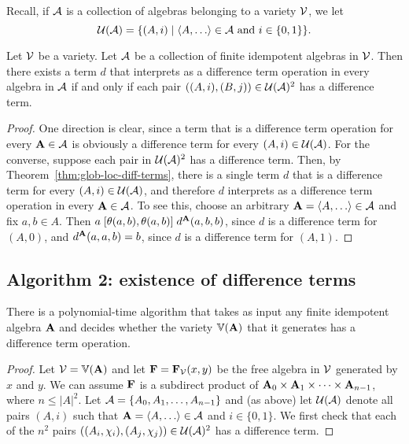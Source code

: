 Recall, if $\mathcal{A}$ is a collection of algebras belonging to a variety $\mathcal{V}$,
we let
\[
\sU(\sA) = \{(A, i) \mid \<A, \dots\> \in \sA \text{ and } i \in
\{0,1\}\}.
\]
\begin{cor}
  \label{cor:glob-loc-diff-term}
  Let $\mathcal{V}$ be a variety.  Let $\mathcal{A}$ be a collection of finite idempotent
  algebras in $\mathcal{V}$. %
  Then there exists a term $d$ that interprets as a difference term operation
  in every algebra in $\mathcal{A}$
  if and only if each pair $((A,i), (B,j)) \in \mathcal{U}(\mathcal{A})^2$ has a \glocal
  difference term.
\end{cor}
\begin{proof}
  One direction is clear, since a term that is a difference term operation for
  every $\mathbf{A} \in \mathcal{A}$ is obviously a \glocal difference term for
  every $(A, i) \in \mathcal{U}(\mathcal{A})$.
  For the converse, suppose
  each pair in $\mathcal{U}(\mathcal{A})^2$ has a \glocal
  difference term. Then, by Theorem~\ref{thm:glob-loc-diff-terms},
  there is a single term $d$ that is a \glocal difference term for every 
  $(A, i) \in \mathcal{U}(\mathcal{A})$, 
  and therefore $d$ interprets as a difference term operation in every $\mathbf{A} \in \mathcal{A}$.
  To see this, choose an arbitrary $\bA = \<A, \dots\> \in \sA$ and fix $a, b \in A$. 
  Then $a \mathrel{[\theta(a,b), \theta(a,b)]} d^{\mathbf{A}}(a,b,b)$,
  since $d$ is a \glocal difference term for $(A,0)$,
  and $d^{\mathbf{A}}(a,a,b) = b$, since $d$ is a \glocal
  difference term for $(A,1)$. 
\end{proof}


\subsection*{Algorithm 2: existence of difference terms}
\begin{cor}
  There is a polynomial-time algorithm that takes as input
  any finite idempotent algebra $\mathbf{A}$ and decides whether
  the variety $\operatorname{\mathbb{V}}(\mathbf{A})$ that it generates
  has a difference term operation.
\end{cor}
\begin{proof}
  Let $\mathcal{V} = \operatorname{\mathbb{V}}(\mathbf{A})$ and let $\mathbf{F} = \mathbf{F}_{\mathcal{V}}(x,y)$ be the free algebra in
  $\mathcal{V}$ generated by $x$ and $y$.
  We can assume $\mathbf{F}$ is a subdirect product of
  $\mathbf{A}_0 \times \mathbf{A}_1 \times \cdots \times \mathbf{A}_{n-1}$, where $n\leq |A|^2$.
  Let $\mathcal{A} = \{A_0, A_1, \dots, A_{n-1}\}$ and (as above) let $\mathcal{U}(\mathcal{A})$ denote 
  all pairs $(A, i)$ such that $\bA = \<A, \dots\> \in \sA$ and $i\in \{0,1\}$.
  We first check that each of the
  $n^2$ pairs 
  $((A_i, \chi_i), (A_j, \chi_j)) \in \mathcal{U}(\mathcal{A})^2$ has a \glocal
  difference term.
\end{proof}


